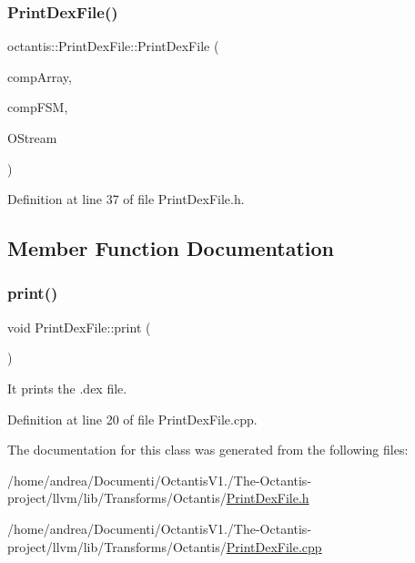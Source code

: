 \subsubsection{\texorpdfstring{Print\+Dex\+File()}{PrintDexFile()}}
{\footnotesize\ttfamily octantis\+::\+Print\+Dex\+File\+::\+Print\+Dex\+File (\begin{DoxyParamCaption}\item[{\hyperlink{classoctantis_1_1LiMArray}{Li\+M\+Array} $\ast$}]{comp\+Array,  }\item[{\hyperlink{classoctantis_1_1FiniteStateMachine}{Finite\+State\+Machine} $\ast$}]{comp\+F\+SM,  }\item[{raw\+\_\+ostream $\ast$}]{O\+Stream }\end{DoxyParamCaption})\hspace{0.3cm}{\ttfamily [inline]}}



Definition at line 37 of file Print\+Dex\+File.\+h.



\subsection{Member Function Documentation}
\mbox{\label{classoctantis_1_1PrintDexFile_a81a7a3c3c35f91aabd83c2902f56dfb1}} 
\subsubsection{\texorpdfstring{print()}{print()}}
{\footnotesize\ttfamily void Print\+Dex\+File\+::print (\begin{DoxyParamCaption}{ }\end{DoxyParamCaption})}



It prints the .dex file. 



Definition at line 20 of file Print\+Dex\+File.\+cpp.



The documentation for this class was generated from the following files\+:\begin{DoxyCompactItemize}
\item 
/home/andrea/\+Documenti/\+Octantis\+V1./\+The-\/\+Octantis-\/project/llvm/lib/\+Transforms/\+Octantis/\hyperlink{PrintDexFile_8h}{Print\+Dex\+File.\+h}\item 
/home/andrea/\+Documenti/\+Octantis\+V1./\+The-\/\+Octantis-\/project/llvm/lib/\+Transforms/\+Octantis/\hyperlink{PrintDexFile_8cpp}{Print\+Dex\+File.\+cpp}\end{DoxyCompactItemize}
